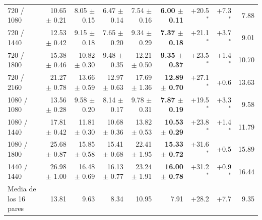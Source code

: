 \begin{table}[!t]
\begin{tabular}{@{}lrrrrrrrr@{}}
720 / 1080 & 10.65 $\pm$ 0.21 & 8.05 $\pm$ 0.15 & 6.47 $\pm$ 0.14 & 7.54 $\pm$ 0.16 & \textbf{6.00 $\pm$ 0.11} & +20.5$^{*}$ & +7.3$^{*}$ & 7.88 \\
720 / 1440 & 12.53 $\pm$ 0.42 & 9.15 $\pm$ 0.18 & 7.65 $\pm$ 0.20 & 9.34 $\pm$ 0.29 & \textbf{7.37 $\pm$ 0.18} & +21.1$^{*}$ & +3.7$^{*}$ & 9.01 \\
720 / 1800 & 15.38 $\pm$ 0.46 & 10.82 $\pm$ 0.30 & 9.48 $\pm$ 0.35 & 12.21 $\pm$ 0.50 & \textbf{9.35 $\pm$ 0.37} & +23.5$^{*}$ & +1.4$^{*}$ & 10.70 \\
720 / 2160 & 21.27 $\pm$ 0.78 & 13.66 $\pm$ 0.59 & 12.97 $\pm$ 0.63 & 17.69 $\pm$ 1.36 & \textbf{12.89 $\pm$ 0.70} & +27.1$^{*}$ & +0.6 & 13.63 \\
1080 / 1080 & 13.56 $\pm$ 0.28 & 9.58 $\pm$ 0.20 & 8.14 $\pm$ 0.17 & 9.78 $\pm$ 0.31 & \textbf{7.87 $\pm$ 0.19} & +19.5$^{*}$ & +3.3$^{*}$ & 9.58 \\
1080 / 1440 & 17.81 $\pm$ 0.42 & 11.81 $\pm$ 0.30 & 10.68 $\pm$ 0.36 & 13.82 $\pm$ 0.53 & \textbf{10.53 $\pm$ 0.29} & +23.8$^{*}$ & +1.4$^{*}$ & 11.79 \\
1080 / 1800 & 25.68 $\pm$ 0.87 & 15.85 $\pm$ 0.58 & 15.41 $\pm$ 0.68 & 22.41 $\pm$ 1.95 & \textbf{15.33 $\pm$ 0.72} & +31.6$^{*}$ & +0.5 & 15.89 \\
1440 / 1440 & 26.98 $\pm$ 1.00 & 16.48 $\pm$ 0.69 & 16.13 $\pm$ 0.77 & 23.24 $\pm$ 1.91 & \textbf{16.00 $\pm$ 0.78} & +31.2$^{*}$ & +0.9$^{*}$ & 16.44 \\
\midrule
Media de los 16 pares & 13.81 & 9.63 & 8.34 & 10.95 & 7.91 & +28.2 & +7.7 & 9.35 \\
\bottomrule
\end{tabular}
\end{table}
